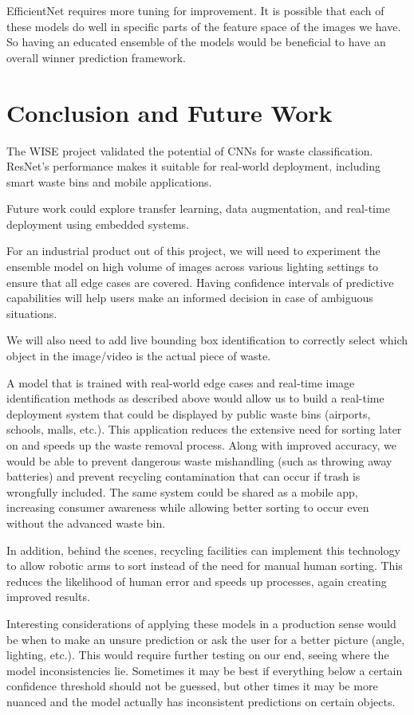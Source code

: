 \documentclass[11pt,twocolumn]{article}
\begin{document}
EfficientNet requires more tuning for improvement. It is possible that each of these models do well in specific parts of the feature space of the images we have. So having an educated ensemble of the models would be beneficial to have an overall winner prediction framework. 

\section{Conclusion and Future Work}
\label{sec:conclusion}
The WISE project validated the potential of CNNs for waste classification. ResNet’s performance makes it suitable for real-world deployment, including smart waste bins and mobile applications. 

Future work could explore transfer learning, data augmentation, and real-time deployment using embedded systems.

For an industrial product out of this project, we will need to experiment the ensemble model on high volume of images across various lighting settings to ensure that all edge cases are covered. Having confidence intervals of predictive capabilities will help users make an informed decision in case of ambiguous situations. 

We will also need to add live bounding box identification to correctly select which object in the image/video is the actual piece of waste. 

A model that is trained with real-world edge cases and real-time image identification methods as described above would allow us to build a real-time deployment system that could be displayed by public waste bins (airports, schools, malls, etc.). This application reduces the extensive need for sorting later on and speeds up the waste removal process. Along with improved accuracy, we would be able to prevent dangerous waste mishandling (such as throwing away batteries) and prevent recycling contamination that can occur if trash is wrongfully included. The same system could be shared as a mobile app, increasing consumer awareness while allowing better sorting to occur even without the advanced waste bin. 

In addition, behind the scenes, recycling facilities can implement this technology to allow robotic arms to sort instead of the need for manual human sorting. This reduces the likelihood of human error and speeds up processes, again creating improved results. 

Interesting considerations of applying these models in a production sense would be when to make an unsure prediction or ask the user for a better picture (angle, lighting, etc.). This would require further testing on our end, seeing where the model inconsistencies lie. Sometimes it may be best if everything below a certain confidence threshold should not be guessed, but other times it may be more nuanced and the model actually has inconsistent predictions on certain objects. 
\end{document}
